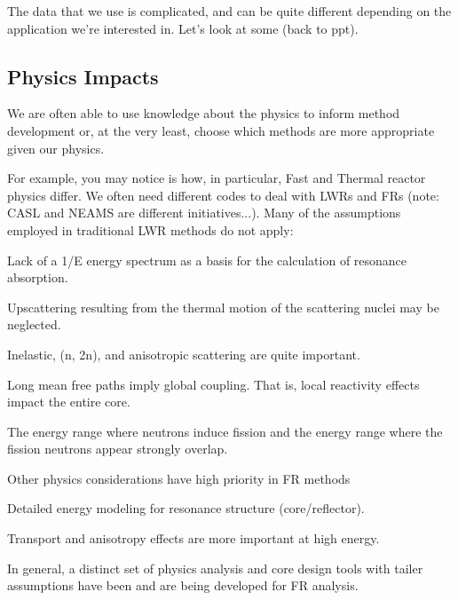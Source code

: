 \documentclass[12pt]{article}
\begin{document}
The data that we use is complicated, and can be quite different depending on the application we're interested in. Let's look at some (back to ppt).

\subsection*{Physics Impacts}
We are often able to use knowledge about the physics to inform method development or, at the very least, choose which methods are more appropriate given our physics. 

For example, you may notice is how, in particular, Fast and Thermal reactor physics differ. We often need different codes to deal with LWRs and FRs (note: CASL and NEAMS are different initiatives...). 
%
Many of the assumptions employed in traditional LWR methods do not apply:
\begin{compactitem}
\item Lack of a 1/E energy spectrum as a basis for the calculation of resonance absorption.
\item Upscattering resulting from the thermal motion of the scattering nuclei may be neglected.
\item Inelastic, (n, 2n), and anisotropic scattering are quite important.
\item Long mean free paths imply global coupling. That is, local reactivity effects impact the entire core.  
\item The energy range where neutrons induce fission and the energy range where the fission neutrons appear strongly overlap.
\end{compactitem}
%
Other physics considerations have high priority in FR methods
\begin{compactitem}
\item Detailed energy modeling for resonance structure (core/reflector).
\item Transport and anisotropy effects are more important at high energy.
\end{compactitem}
%
In general, a distinct set of physics analysis and core design tools with tailer assumptions have been and are being developed for FR analysis.


\end{document}
